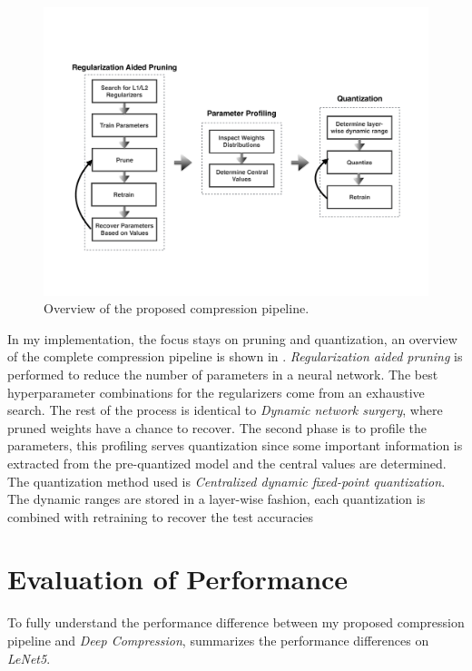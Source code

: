 \documentclass[a4paper,12pt]{report}
\begin{document}
\begin{figure}[!h]
  \includegraphics[width=\textwidth]{fig_proposed_flow.pdf}
  \caption{Overview of the proposed compression pipeline.}
  \label{fig:proposed_compression_flow}
\end{figure}

In my implementation, the focus stays on pruning and quantization, an overview
of the complete compression pipeline is shown in .
\textit{Regularization aided pruning} is performed to reduce the number of
parameters in a neural network.
The best hyperparameter combinations for the regularizers come from an exhaustive
search.
The rest of the process is identical to \textit{Dynamic network surgery}, where
pruned weights have a chance to recover.
The second phase is to profile the parameters, this profiling serves quantization
since some important information is extracted from the pre-quantized model and
the central values are determined.
The quantization method used is \textit{Centralized dynamic fixed-point quantization}.
The dynamic ranges are stored in a layer-wise fashion, each quantization is
combined with retraining to recover the test accuracies

\section{Evaluation of Performance}
To fully understand the performance difference between my proposed compression
pipeline and \textit{Deep Compression},  summarizes the
performance differences on \textit{LeNet5}.
\end{document}
